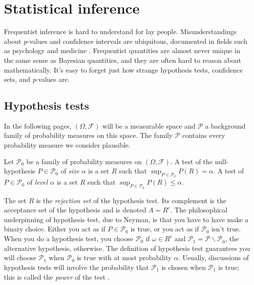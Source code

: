 \section{Statistical inference}

Frequentist inference is hard to understand for lay people. Misunderstandings about \emph{p}-values and confidence intervals are ubiquitous, documented in fields such as psychology \parencite{Belia2005-di,Gigerenzer2018-oi} and medicine \parencite{Goodman2008-ed,Gigerenzer2007-qi}. Frequentist quantities are almost never unique in the same sense as Bayesian quantities, and they are often hard to reason about mathematically. It's easy to forget just how strange hypothesis tests, confidence
sets, and \emph{p}-values are. 

\subsection{Hypothesis tests}

In the following pages, $(\Omega,\mathcal{\mathcal{F}})$ will be a measurable space and $\mathcal{P}$ a background family of probability measures on this space. The family $\mathcal{P}$ contains every probability measure we consider plausible. 
\begin{definition}
\parencite[][Chapter 3.1]{Lehmann2005-sp} Let $\mathcal{P}_{0}$ be a family
of probability measures on $(\Omega,\mathcal{F})$. A test of the
null-hypothesis $P\in\mathcal{P}_{0}$ of \emph{size} $\alpha$ is
a set $R$ such that $\sup_{P\in\mathcal{P}_{0}}P(R)=\alpha.$ A test
of $P\in\mathcal{P}_{0}$ of \emph{level $\alpha$ }is a set $R$
such that $\sup_{P\in\mathcal{P}_{0}}P(R)\leq\alpha.$
\end{definition}

The set $R$ is the \emph{rejection set} of the hypothesis test. Its complement is the acceptance set of the hypothesis and is denoted $A=R^{c}$. The philosophical underpinning of hypothesis test, due to Neyman, is that you have to have make a binary choice. Either you act as if $P\in\mathcal{P}_{0}$ is true, or you act as if $\mathcal{P}_{0}$ isn't true. When you do a hypothesis test, you choose $\mathcal{P}_{0}$ if $\omega\in R^{c}$ and $\mathcal{P}_{1}=\mathcal{P\backslash P}_{0}$, the alternative hypothesis, otherwise. The definition of hypothesis test guarantees you will choose $\mathcal{P}_{1}$ when $\mathcal{P}_{0}$ is true with at most probability $\alpha$. Usually, discussions of hypothesis tests will involve the probability that $\mathcal{P}_{1}$ is chosen when $\mathcal{P}_{1}$ is true; this is called the \emph{power} of the test \parencite{Neyman1977-nx}.


